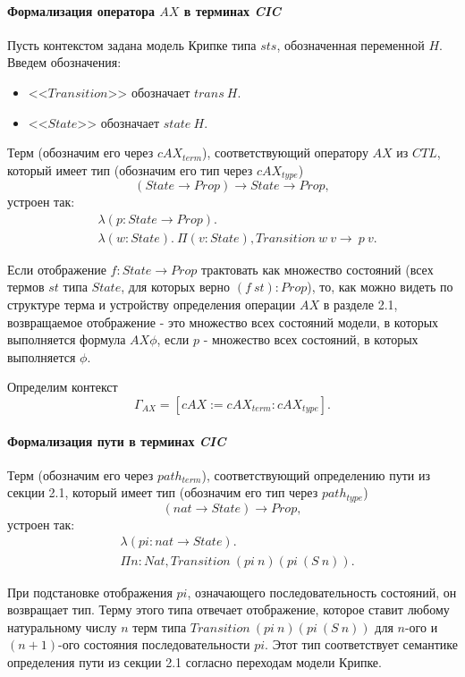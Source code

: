 \documentclass[12pt]{article}
\begin{document}
\paragraph{Формализация оператора $AX$ в терминах \textit{CIC}}\mbox{}

Пусть контекстом задана модель Крипке типа $sts$, обозначенная переменной $H$.
Введем обозначения:
\begin{itemize}
    \item <<$Transition$>> обозначает $trans\ H$.
    \item <<$State$>> обозначает $state\ H$.
\end{itemize}

Терм (обозначим его через $cAX_{term}$), соответствующий оператору $AX$ из $CTL$, который имеет тип (обозначим его тип через $cAX_{type}$) 
$$(State \xrightarrow{} Prop) \xrightarrow{} State \xrightarrow{} Prop,$$
устроен так:
\begin{align*}
& \lambda (p : State \xrightarrow{} Prop). \\ 
& \lambda (w : State).\ \Pi (v : State), Transition\ w\ v \xrightarrow{}\ p\ v.
\end{align*}

Если отображение $f : State \xrightarrow{} Prop$ трактовать как множество состояний (всех термов $st$ типа $State$, для которых верно $(f\ st) : Prop$), то, как можно видеть по структуре терма и устройству определения операции $AX$ в разделе 2.1, возвращаемое отображение - это множество всех состояний модели, в которых выполняется формула $AX \phi$, если $p$ - множество всех состояний, в которых выполняется $\phi$.

Определим контекст $$\Gamma_{AX} = [cAX:=cAX_{term}:cAX_{type}].$$

\paragraph{Формализация пути в терминах \textit{CIC}}\mbox{} 

Терм (обозначим его через $path_{term}$), соответствующий определению пути из секции 2.1, который имеет тип (обозначим его тип через $path_{type}$) 
$$(nat \xrightarrow{} State) \xrightarrow{} Prop,$$
устроен так:
\begin{align*}
& \lambda (pi : nat \xrightarrow{} State).\\ 
& \Pi n : Nat, Transition\ (pi\ n) (pi\ (S\ n)).
\end{align*}

При подстановке отображения $pi$, означающего последовательность состояний, он возвращает тип. 
Терму этого типа отвечает отображение, которое ставит любому натуральному числу $n$ терм типа $Transition\ (pi\ n) (pi\ (S\ n))$ для $n$-ого и $(n+1)$-ого состояния последовательности $pi$.
Этот тип соответствует семантике определения пути из секции 2.1 согласно переходам модели Крипке.
\end{document}
